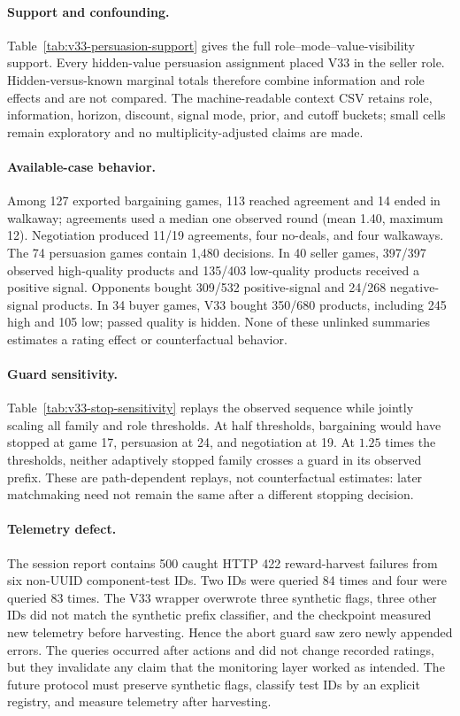 \paragraph{Support and confounding.}
Table~\ref{tab:v33-persuasion-support} gives the full role--mode--value-visibility
support. Every hidden-value persuasion assignment placed V33 in the seller
role. Hidden-versus-known marginal totals therefore combine information and
role effects and are not compared. The machine-readable context CSV retains
role, information, horizon, discount, signal mode, prior, and cutoff buckets;
small cells remain exploratory and no multiplicity-adjusted claims are made.

\paragraph{Available-case behavior.}
Among 127 exported bargaining games, 113 reached agreement and 14 ended in
walkaway; agreements used a median one observed round (mean 1.40, maximum 12).
Negotiation produced 11/19 agreements, four no-deals, and four walkaways. The 74
persuasion games contain 1,480 decisions. In 40 seller games, 397/397 observed
high-quality products and 135/403 low-quality products received a positive
signal. Opponents bought 309/532 positive-signal and 24/268 negative-signal
products. In 34 buyer games, V33 bought 350/680 products, including 245 high and
105 low; passed quality is hidden. None of these unlinked summaries estimates a
rating effect or counterfactual behavior.

\paragraph{Guard sensitivity.}
Table~\ref{tab:v33-stop-sensitivity} replays the observed sequence while jointly
scaling all family and role thresholds. At half thresholds, bargaining would
have stopped at game 17, persuasion at 24, and negotiation at 19. At $1.25$
times the thresholds, neither adaptively stopped family crosses a guard in its
observed prefix. These are path-dependent replays, not counterfactual estimates:
later matchmaking need not remain the same after a different stopping decision.

\paragraph{Telemetry defect.}
The session report contains 500 caught HTTP 422 reward-harvest failures from six
non-UUID component-test IDs. Two IDs were queried 84 times and four were queried
83 times. The V33 wrapper overwrote three synthetic flags, three other IDs did
not match the synthetic prefix classifier, and the checkpoint measured new
telemetry before harvesting. Hence the abort guard saw zero newly appended
errors. The queries occurred after actions and did not change recorded ratings,
but they invalidate any claim that the monitoring layer worked as intended.
The future protocol must preserve synthetic flags, classify test IDs by an
explicit registry, and measure telemetry after harvesting.


